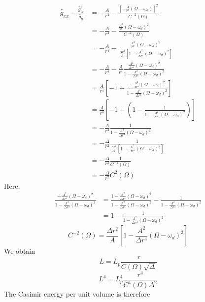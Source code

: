 \documentclass[english]{article}
\begin{document}
\begin{align*}
\hat{g}_{xx}-\frac{\hat{g}^{2}_{tx}}{\hat{g}_{tt}} & =-\frac{A}{r^{4}}-\frac{\left[-\frac{A}{r^{3}}\left(\Omega-\omega_{d}\right)\right]^{2}}{C^{-2}\left(\Omega\right)}\\
 & =-\frac{A}{r^{4}}-\frac{\frac{A^{2}}{r^{6}}\left(\Omega-\omega_{d}\right)^{2}}{C^{-2}\left(\Omega\right)}\\
 & =-\frac{A}{r^{4}}-\frac{\frac{A^{2}}{r^{6}}\left(\Omega-\omega_{d}\right)^{2}}{\frac{\Delta r^{2}}{A}\left[1-\frac{A^{2}}{\Delta r^{4}}\left(\Omega-\omega_{d}\right)^{2}\right]}\\
 & =-\frac{A}{r^{4}}-\frac{A}{r^{4}}\frac{\frac{A^{2}}{\Delta r^{4}}\left(\Omega-\omega_{d}\right)^{2}}{1-\frac{A^{2}}{\Delta r^{4}}\left(\Omega-\omega_{d}\right)^{2}}\\
 & =\frac{A}{r^{4}}\left[-1+\frac{-\frac{A^{2}}{\Delta r^{4}}\left(\Omega-\omega_{d}\right)^{2}}{1-\frac{A^{2}}{\Delta r^{4}}\left(\Omega-\omega_{d}\right)^{2}}\right]\\
 & =\frac{A}{r^{4}}\left[-1+\left(1-\frac{1}{1-\frac{A^{2}}{\Delta r^{4}}\left(\Omega-\omega_{d}\right)^{2}}\right)\right]\\
 & =-\frac{A}{r^{4}}\frac{1}{1-\frac{A^{2}}{\Delta r^{4}}\left(\Omega-\omega_{d}\right)^{2}}\\
 & =-\frac{\Delta}{r^{2}}\frac{1}{\frac{\Delta r^{2}}{A}\left[1-\frac{A^{2}}{\Delta r^{4}}\left(\Omega-\omega_{d}\right)^{2}\right]}\\
 & =-\frac{\Delta}{r^{2}}\frac{1}{C^{-2}\left(\Omega\right)}\\
 & =-\frac{\Delta}{r^{2}}C^{2}\left(\Omega\right)
\end{align*}
 Here, 
\begin{align*}
\frac{-\frac{A^{2}}{\Delta r^{4}}\left(\Omega-\omega_{d}\right)^{2}}{1-\frac{A^{2}}{\Delta r^{4}}\left(\Omega-\omega_{d}\right)^{2}} & =\frac{1-\frac{A^{2}}{\Delta r^{4}}\left(\Omega-\omega_{d}\right)^{2}}{1-\frac{A^{2}}{\Delta r^{4}}\left(\Omega-\omega_{d}\right)^{2}}-\frac{1}{1-\frac{A^{2}}{\Delta r^{4}}\left(\Omega-\omega_{d}\right)^{2}}\\
 & =1-\frac{1}{1-\frac{A^{2}}{\Delta r^{4}}\left(\Omega-\omega_{d}\right)^{2}}
\end{align*}
 {}
\[
C^{-2}\left(\Omega\right)=\frac{\Delta r^{2}}{A}\left[1-\frac{A^{2}}{\Delta r^{4}}\left(\Omega-\omega_{d}\right)^{2}\right]
\]
 We obtain 
\[
L=L_{p}\frac{r}{C\left(\Omega\right)\sqrt{\Delta}}
\]
 {}
\[
L^{4}=L^{4}_{p}\frac{r^{4}}{C^{4}\left(\Omega\right)\Delta^{2}}
\]
 The Casimir energy per unit volume is therefore 
\end{document}

